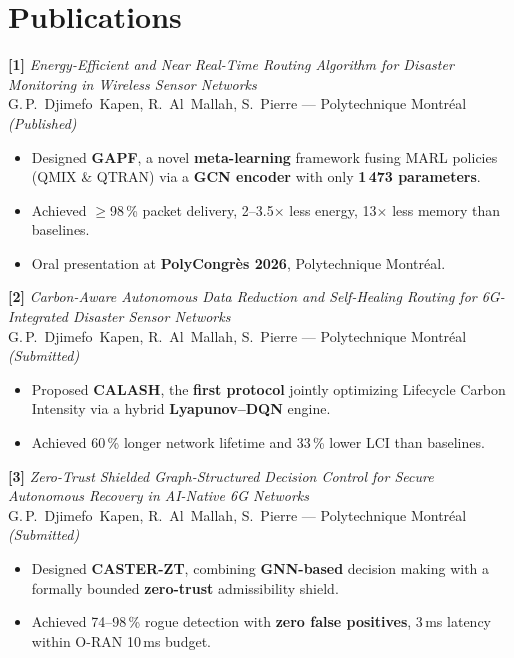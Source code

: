 \documentclass[10pt,a4paper,sans]{moderncv}
\begin{document}
\section{Publications}

\textbf{[1]} \textit{Energy-Efficient and Near Real-Time Routing Algorithm for
Disaster Monitoring in Wireless Sensor Networks}\\
G.\,P.~Djimefo~Kapen, R.~Al~Mallah, S.~Pierre --- Polytechnique
Montréal \hfill \textit{(Published)}
\begin{itemize}[leftmargin=1.5em, topsep=2pt, itemsep=0pt, parsep=0pt]
  \item Designed \textbf{GAPF}, a novel \textbf{meta-learning} framework fusing
        MARL policies (QMIX \& QTRAN) via a \textbf{GCN encoder} with only
        \textbf{1\,473 parameters}.
  \item Achieved $\geq$98\,\% packet delivery, 2--3.5$\times$ less energy,
        13$\times$ less memory than baselines.
  \item Oral presentation at \textbf{PolyCongrès 2026}, Polytechnique Montréal.
\end{itemize}

\vspace{0.4em}
\textbf{[2]} \textit{Carbon-Aware Autonomous Data Reduction and Self-Healing
Routing for 6G-Integrated Disaster Sensor Networks}\\
G.\,P.~Djimefo~Kapen, R.~Al~Mallah, S.~Pierre --- Polytechnique
Montréal \hfill \textit{(Submitted)}
\begin{itemize}[leftmargin=1.5em, topsep=2pt, itemsep=0pt, parsep=0pt]
  \item Proposed \textbf{CALASH}, the \textbf{first protocol} jointly optimizing
        Lifecycle Carbon Intensity via a hybrid \textbf{Lyapunov--DQN} engine.
  \item Achieved 60\,\% longer network lifetime and 33\,\% lower LCI than baselines.
\end{itemize}

\vspace{0.4em}
\textbf{[3]} \textit{Zero-Trust Shielded Graph-Structured Decision Control for
Secure Autonomous Recovery in AI-Native 6G Networks}\\
G.\,P.~Djimefo~Kapen, R.~Al~Mallah, S.~Pierre --- Polytechnique
Montréal \hfill \textit{(Submitted)}
\begin{itemize}[leftmargin=1.5em, topsep=2pt, itemsep=0pt, parsep=0pt]
  \item Designed \textbf{CASTER-ZT}, combining \textbf{GNN-based} decision
        making with a formally bounded \textbf{zero-trust} admissibility shield.
  \item Achieved 74--98\,\% rogue detection with \textbf{zero false positives},
        3\,ms latency within O-RAN 10\,ms budget.
\end{itemize}
\end{document}

